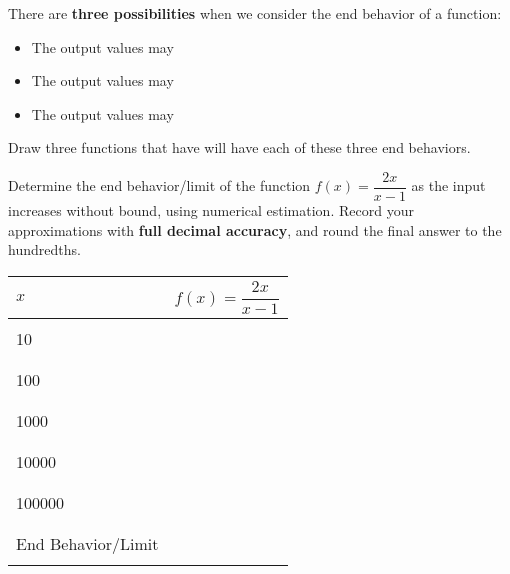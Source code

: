 \documentclass[notes]{subfiles}
\begin{document}
		There are \textbf{three possibilities} when we consider the end behavior of a function:\\
		\begin{itemize}
			\item The output values may \\
			\item The output values may \\
			\item The output values may 
		\end{itemize}
		
		\begin{ex}
			Draw three functions that have will have each of these three end behaviors.
		\end{ex}
			\newpage
		\begin{ex}
			Determine the end behavior/limit of the function $f(x) = \dfrac{2x}{x-1}$ as the input increases without bound, using numerical estimation.  Record your approximations with \textbf{full decimal accuracy}, and round the final answer to the hundredths.
		\end{ex}
			\begin{center}
				\begin{minipage}{.85\textwidth}
					\tabulinesep=1mm
					\begin{tabu}{|X[c]|X[2,c]|}\hline
						$x$ & $f(x) = \dfrac{2x}{x-1}$ \\ \hline
							& \\
						10	& \\ 
							& \\ \hline
							& \\
						100	& \\
							& \\ \hline 
							& \\
						1000& \\ 
							& \\ \hline
							& \\ 
						10000& \\ 
							 & \\ \hline
							 & \\
						100000&\\
							  &\\ \hline\hline
							  &\\
						End Behavior/\newline Limit & \\
									&\\ \hline
					\end{tabu}
				\end{minipage}
			\end{center}
\end{document}
